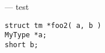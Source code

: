 \startmanpage
{}
--- test  
\startvb\begin{verbatim}
struct tm *foo2( a, b )
MyType *a;
short b;

\end{verbatim}
\endvb

\endmanpage
